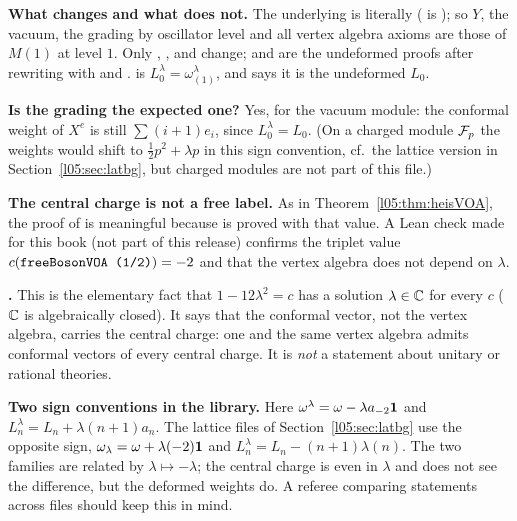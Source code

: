 \begin{dictionary}
\textbf{What changes and what does not.} The underlying  is literally 
( is ); so $Y$, the vacuum, the grading by oscillator level and
all vertex algebra axioms are those of $M(1)$ at level $1$. Only ,
,  and  change;  and
 are the undeformed proofs after rewriting with  and .
 is $L^\lambda_0=\omega^\lambda_{(1)}$, and  says it is
the undeformed $L_0$.

\textbf{Is the grading the expected one?} Yes, for the vacuum module: the conformal weight of
$X^e$ is still $\sum(i+1)e_i$, since $L^\lambda_0=L_0$. (On a charged module $\mathcal{F}_p$ the weights would shift
to $\frac12p^2+\lambda p$ in this sign convention, cf.\ the lattice version in Section~\ref{l05:sec:latbg}, but charged modules are
not part of this file.)

\textbf{The central charge is not a free label.} As in Theorem~\ref{l05:thm:heisVOA}, the  proof of
 is meaningful because  is proved with that value. A
Lean check made for this book (not part of this release) confirms the triplet value
$c(\lean{freeBosonVOA (1/2)})=-2$ and that the vertex algebra does not depend on $\lambda$.

\textbf{.} This is the elementary fact that $1-12\lambda^2=c$ has a solution
$\lambda\in{\mathbb{C}}$ for every $c$ (${\mathbb{C}}$ is algebraically closed). It says that the conformal vector, not the vertex
algebra, carries the central charge: one and the same vertex algebra admits conformal vectors of every central
charge. It is \emph{not} a statement about unitary or rational theories.

\textbf{Two sign conventions in the library.} Here $\omega^\lambda=\omega-\lambda a_{-2}\mathbf{1}$ and
$L^\lambda_n=L_n+\lambda(n+1)a_n$. The lattice files of Section~\ref{l05:sec:latbg} use the opposite sign,
$\omega_\lambda=\omega+\lambda(-2)\mathbf{1}$ and $L^\lambda_n=L_n-(n+1)\lambda(n)$. The two families are related by
$\lambda\mapsto-\lambda$; the central charge is even in $\lambda$ and does not see the difference, but the
deformed weights do. A referee comparing statements across files should keep this in mind.
\end{dictionary}

